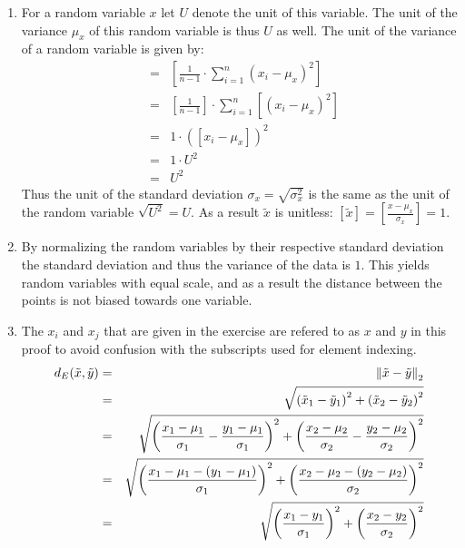 \documentclass[DIN, pagenumber=false, fontsize=11pt, parskip=half]{scrartcl}
\begin{document}
    \begin{enumerate}[label=\alph*)]
        \item For a random variable $x$ let $U$ denote the unit of this variable. The unit of the variance $\mu_x$ of this random variable is thus $U$ as well.
            The unit of the variance of a random variable is given by:
            \begin{eqnarray*}
                [\sigma_x^2] &=& \left[\frac{1}{n-1} \cdot \sum_{i=1}^n {(x_i - \mu_x)}^2\right] \\
                &=& \left[\frac{1}{n-1}\right] \cdot \sum_{i=1}^n \left[{(x_i - \mu_x)}^2\right] \\
                &=& 1 \cdot {([x_i - \mu_x])}^2 \\
                &=& 1 \cdot U^2 \\
                &=& U^2
            \end{eqnarray*}
            Thus the unit of the standard deviation $\sigma_x = \sqrt{\sigma_x^2}$ is the same as the unit of the random variable $\sqrt{U^2} = U$.
            As a result $\tilde{x}$ is unitless: $[\tilde{x}] = [\frac{x - \mu_x}{\sigma_x}] = 1$.
        \item By normalizing the random variables by their respective standard deviation the standard deviation and thus the variance of the data is $1$.
            This yields random variables with equal scale, and as a result the distance between the points is not biased towards one variable.
        \item The $x_i$ and $x_j$ that are given in the exercise are refered to as $x$ and $y$ in this proof to avoid confusion with the subscripts used for element indexing.
            \begin{eqnarray*}
                d_E(\tilde{x}, \tilde{y}) &=& \norm{\tilde{x} - \tilde{y}}_2 \\
                    &=& \sqrt{{(\tilde{x}_1 - \tilde{y}_1)}^2 + {(\tilde{x}_2 - \tilde{y}_2)}^2} \\
                    &=& \sqrt{{\left(\frac{x_1 - \mu_1}{\sigma_1} - \frac{y_1 - \mu_1}{\sigma_1}\right)}^2 + {\left(\frac{x_2 - \mu_2}{\sigma_2} - \frac{y_2 - \mu_2}{\sigma_2}\right)}^2} \\
                    &=& \sqrt{{\left(\frac{x_1 - \mu_1 - (y_1 - \mu_1)}{\sigma_1}\right)}^2 + {\left(\frac{x_2 - \mu_2 - (y_2 - \mu_2)}{\sigma_2}\right)}^2} \\
                    &=& \sqrt{{\left(\frac{x_1 - y_1}{\sigma_1}\right)}^2 + {\left(\frac{x_2 - y_2}{\sigma_2}\right)}^2} \\

\end{eqnarray*}
\end{enumerate}
\end{document}
